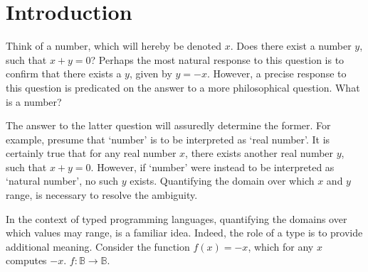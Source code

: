 \documentclass[../Dissertation.tex]{subfiles}
\begin{document}
\section{Introduction}
Think of a number, which will hereby be denoted $x$. Does there exist a number $y$, such that $x + y = 0$? Perhaps the most natural response to this question is to confirm that there exists a $y$, given by $y = -x$. However, a precise response to this question is predicated on the answer to a more philosophical question. What is a number?
\par
The answer to the latter question will assuredly determine the former. For example, presume that `number' is to be interpreted as `real number'. It is certainly true that for any real number $x$, there exists another real number $y$, such that $x + y = 0$. However, if `number' were instead to be interpreted as `natural number', no such $y$ exists. Quantifying the domain over which $x$ and $y$ range, is necessary to resolve the ambiguity.
\par
In the context of typed programming languages, quantifying the domains over which values may range, is a familiar idea. Indeed, the role of a type is to provide additional meaning. Consider the function $f(x) = -x$, which for any $x$ computes $-x$. $f : \mathbb{B} \rightarrow \mathbb{B}$.
\end{document}
